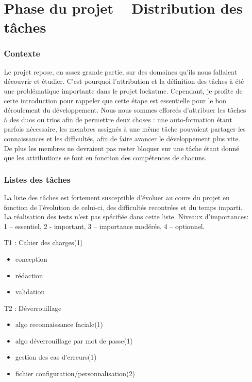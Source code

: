 \part{Phase du projet -- Distribution des tâches}
\section{Contexte}
Le projet repose, en assez grande partie, sur des domaines qu’ils nous
fallaient découvrir et étudier. C’est pourquoi l’attribution et la définition
des tâches à été une problématique importante dans le projet lockatme.
Cependant, je profite de cette introduction pour rappeler que cette étape est
essentielle pour le bon déroulement du développement. Nous nous sommes efforcés
d’attribuer les tâches à des duos ou trios afin de permettre deux choses : une
auto-formation étant parfois nécessaire, les membres assignés à une même tâche
pouvaient partager les connaissances et les difficultés, afin de faire avancer
le développement plus vite. De plus les membres ne devraient pas rester bloquer
sur une tâche étant donné que les attributions se font en fonction des
compétences de chacuns.

\section{Listes des tâches}
La liste des tâches est fortement susceptible d’évoluer au cours du projet en
fonction de l’évolution de celui-ci, des difficultés recontrées et du temps
imparti. La réalisation des tests n’est pas spécifiée dans cette liste.
Niveaux d’importances: 1 – essentiel, 2 - important, 3 – importance modérée,
4 – optionnel.

T1 : Cahier des charges(1)
\begin{itemize}
  \item{conception}
  \item{rédaction}
  \item{validation}
\end{itemize}

T2 : Déverrouillage
\begin{itemize}
  \item{algo reconnaissance faciale(1)}
  \item{algo déverrouillage par mot de passe(1)}
  \item{gestion des cas d’erreurs(1)}
  \item{fichier configuration/personnalisation(2)}
\end{itemize}

